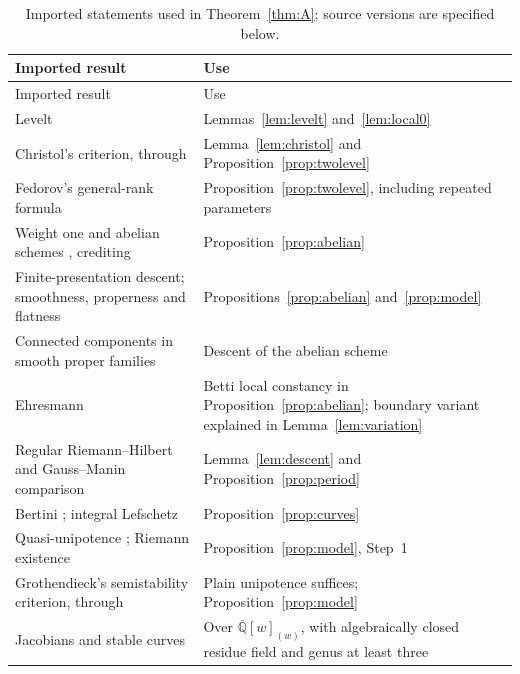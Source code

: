 \documentclass[11pt]{amsart}
\theoremstyle{definition}
\theoremstyle{remark}
\numberwithin{equation}{section}
\newcommand{\Qb}{\overline{\mathbb{Q}}}
\begin{document}
\small
\begin{longtable}{>{\raggedright\arraybackslash}p{}>{\raggedright\arraybackslash}p{}}
\caption{Imported statements used in Theorem~\ref{thm:A}; source versions are specified below.}\label{tab:imports}\\
\toprule Imported result & Use\\\midrule\endfirsthead
\toprule Imported result & Use\\\midrule\endhead
\bottomrule\endfoot
Levelt \citep[Propositions~3.2--3.3, Theorem~3.5]{BeukersHeckman1989} & Lemmas~\ref{lem:levelt} and~\ref{lem:local0}\\
Christol's criterion, through \citep[Theorem~2.3]{FurnsinnYurkevich2024} & Lemma~\ref{lem:christol} and Proposition~\ref{prop:twolevel}\\
Fedorov's general-rank formula \citep[Proposition~2.6, Theorem~1]{Fedorov2018} & Proposition~\ref{prop:twolevel}, including repeated parameters\\
Weight one and abelian schemes \citep[Theorem~7.13]{Milne2013}, crediting \citep[4.4.3]{Deligne1971} & Proposition~\ref{prop:abelian}\\
Finite-presentation descent; smoothness, properness and flatness \citep[Tags 01ZM, 0C0C, 081F, 04AI]{StacksProject} & Propositions~\ref{prop:abelian} and~\ref{prop:model}\\
Connected components in smooth proper families \citep[Tag 0E0N]{StacksProject} & Descent of the abelian scheme\\
Ehresmann \citep[\S1, p.~154]{Ehresmann1952} & Betti local constancy in Proposition~\ref{prop:abelian}; boundary variant explained in Lemma~\ref{lem:variation}\\
Regular Riemann--Hilbert and Gauss--Manin comparison \citep[I.2.17, II.5.9, II.6.13--6.14, II.7.9]{Deligne1970} & Lemma~\ref{lem:descent} and Proposition~\ref{prop:period}\\
Bertini \citep[Tag 0FD6 and Section 37.32]{StacksProject}; integral Lefschetz \citep[Theorem~3]{Catanese2015} & Proposition~\ref{prop:curves}\\
Quasi-unipotence \citep[III.2.3]{Deligne1970}; Riemann existence \citep[Remark~3.3(c), Theorem~3.4]{MilneEtale2013} & Proposition~\ref{prop:model}, Step~1\\
Grothendieck's semistability criterion, through \citep[Theorem~4.1]{SilverbergZarhin2001} & Plain unipotence suffices; Proposition~\ref{prop:model}\\
Jacobians and stable curves \citep[Theorem~2.4]{DeligneMumford1969} & Over $\Qb[w]_{(w)}$, with algebraically closed residue field and genus at least three\\

\end{longtable}
\end{document}
